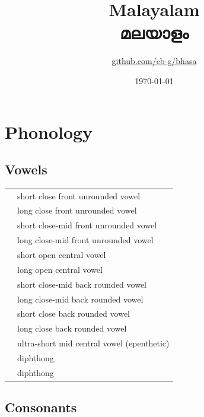 \documentclass{article}
\title{Malayalam\\{\malayalamfont മലയാളം}\\\ipa{[m5l5ja:\:l5m]}}
\author{\href{https://github.com/cb-g/bhasa}{github.com/cb-g/bhasa}}
\date{\today}
\begin{document}
\pagecolor{custom_bg}\color{custom_fg}
\maketitle\thispagestyle{empty}

\newpage\setcounter{page}{1}\section{Phonology}

\subsection{Vowels}

\begin{xltabular}{\textwidth}{lL}
   & short close front unrounded vowel \\
   & long close front unrounded vowel \\
   & short close-mid front unrounded vowel \\
   & long close-mid front unrounded vowel \\
   & short open central vowel \\
   & long open central vowel \\
   & short close-mid back rounded vowel \\
   & long close-mid back rounded vowel \\
   & short close back rounded vowel \\
   & long close back rounded vowel \\
   & ultra-short mid central vowel (epenthetic) \\
   & diphthong \\
   & diphthong \\
\end{xltabular}

\subsection{Consonants}
\end{document}
